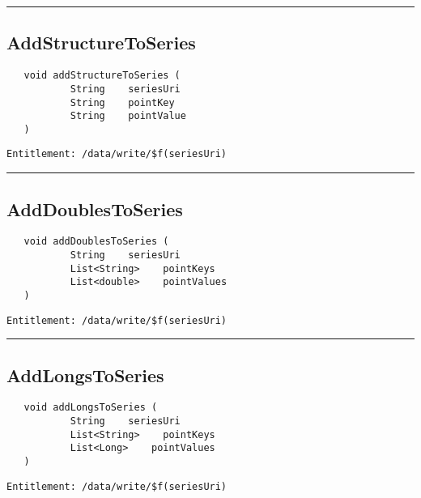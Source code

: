 \rule{12cm}{2pt}
\subsection{AddStructureToSeries}
\label{Api:AddStructureToSeries}
\begin{Verbatim}
   void addStructureToSeries (
           String    seriesUri
           String    pointKey
           String    pointValue
   )
\end{Verbatim}
\begin{Verbatim}[formatcom=\color{Maroon}]
  Entitlement: /data/write/$f(seriesUri)
\end{Verbatim}



\rule{12cm}{2pt}
\subsection{AddDoublesToSeries}
\label{Api:AddDoublesToSeries}
\begin{Verbatim}
   void addDoublesToSeries (
           String    seriesUri
           List<String>    pointKeys
           List<double>    pointValues
   )
\end{Verbatim}
\begin{Verbatim}[formatcom=\color{Maroon}]
  Entitlement: /data/write/$f(seriesUri)
\end{Verbatim}



\rule{12cm}{2pt}
\subsection{AddLongsToSeries}
\label{Api:AddLongsToSeries}
\begin{Verbatim}
   void addLongsToSeries (
           String    seriesUri
           List<String>    pointKeys
           List<Long>    pointValues
   )
\end{Verbatim}
\begin{Verbatim}[formatcom=\color{Maroon}]
  Entitlement: /data/write/$f(seriesUri)
\end{Verbatim}




